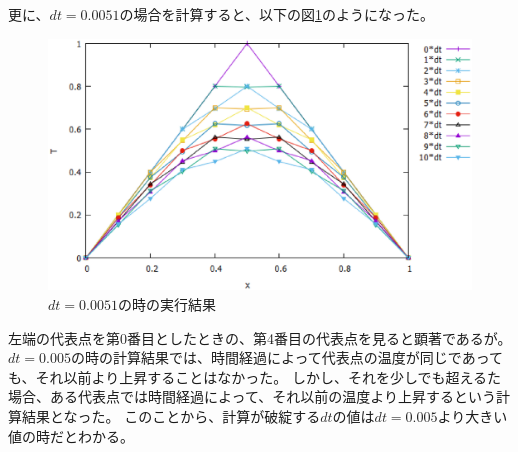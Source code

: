 \documentclass{jsarticle}
\begin{document}
更に、$dt=0.0051$の場合を計算すると、以下の図\ref{fig06}のようになった。
\begin{figure}[H]
	\centering
	\includegraphics[width=14cm]{pic06.eps}
	\caption{$dt=0.0051$の時の実行結果}
	\label{fig06}
\end{figure}
左端の代表点を第0番目としたときの、第4番目の代表点を見ると顕著であるが。
$dt=0.005$の時の計算結果では、時間経過によって代表点の温度が同じであっても、それ以前より上昇することはなかった。
しかし、それを少しでも超えるた場合、ある代表点では時間経過によって、それ以前の温度より上昇するという計算結果となった。
このことから、計算が破綻する$dt$の値は$dt=0.005$より大きい値の時だとわかる。
\end{document}

